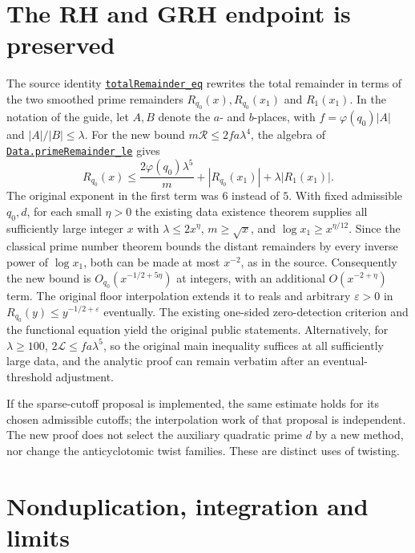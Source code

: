 \documentclass[11pt,letterpaper]{article}
\theoremstyle{remark}\newtheorem{remark}[theorem]{Remark}
\newcommand{\R}{\mathcal R}\newcommand{\E}{\mathcal E}\newcommand{\Lfour}{\mathcal L}\newcommand{\K}{\mathcal K}\newcommand{\G}{\mathcal G}\newcommand{\Gr}{\operatorname{Gram}}\newcommand{\rk}{\operatorname{rank}}\newcommand{\Height}{\operatorname{HeightLe}}
\newcommand{\src}[3]{\href{https://github.com/VladimirReshetnikov/ProveIt/blob/89d12dd40424f1217fd818d84877b3da52396a3b/Analysis/GeneralizedRiemannHypothesis/Lean/grh/src/#1.lean\#L#2}{\texttt{#3}}}
\begin{document}
\section{The RH and GRH endpoint is preserved}
The source identity \src{New/Reduction/PrimeSums}{177}{totalRemainder\_eq} rewrites the total remainder in terms of the two smoothed prime remainders $R_{q_0}(x),R_{q_0}(x_1)$ and $R_1(x_1)$. In the notation of the guide, let $A,B$ denote the $a$- and $b$-places, with $f=\varphi(q_0)|A|$ and $|A|/|B|\le\lambda$. For the new bound $m\R\le2fa\lambda^4$, the algebra of \src{New/Reduction/OneSidedBound}{33}{Data.primeRemainder\_le} gives
\[
 R_{q_0}(x)\le\frac{2\varphi(q_0)\lambda^5}{m}
 +|R_{q_0}(x_1)|+\lambda|R_1(x_1)|.
\]
The original exponent in the first term was $6$ instead of $5$. With fixed admissible $q_0,d$, for each small $\eta>0$ the existing data existence theorem supplies all sufficiently large integer $x$ with $\lambda\le2x^\eta$, $m\ge\sqrt x$, and $\log x_1\ge x^{\eta/12}$. Since the classical prime number theorem bounds the distant remainders by every inverse power of $\log x_1$, both can be made at most $x^{-2}$, as in the source. Consequently the new bound is $O_{q_0}(x^{-1/2+5\eta})$ at integers, with an additional $O(x^{-2+\eta})$ term. The original floor interpolation extends it to reals and arbitrary $\varepsilon>0$ in $R_{q_0}(y)\le y^{-1/2+\varepsilon}$ eventually. The existing one-sided zero-detection criterion and the functional equation yield the original public statements. Alternatively, for $\lambda\ge100$, $2\Lfour\le fa\lambda^5$, so the original main inequality suffices at all sufficiently large data, and the analytic proof can remain verbatim after an eventual-threshold adjustment.

If the sparse-cutoff proposal is implemented, the same estimate holds for its chosen admissible cutoffs; the interpolation work of that proposal is independent. The new proof does not select the auxiliary quadratic prime $d$ by a new method, nor change the anticyclotomic twist families. These are distinct uses of twisting.

\section{Nonduplication, integration and limits}
\end{document}
